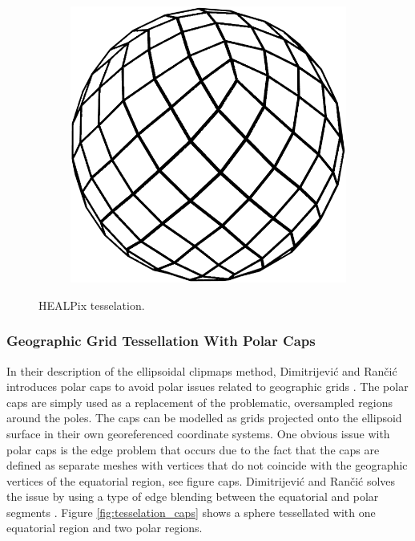 \begin{figure}
\begin{subfigure}[b]{0.2\textwidth}
    \end{subfigure}
    ~ %
    \begin{subfigure}[b]{0.2\textwidth}
        \includegraphics[width=\textwidth]{figures/tessellation/tessellation_healpix3.png}
    \end{subfigure}
    \caption{HEALPix tesselation.}
    \label{fig:tesselation_healpix}
\end{figure}

\subsubsection{Geographic Grid Tessellation With Polar Caps}

In their description of the ellipsoidal clipmaps method, Dimitrijevi\'{c} and Ran\v{c}i\'{c} introduces polar caps to avoid polar issues related to geographic grids \cite{dimi15}. The polar caps are simply used as a replacement of the problematic, oversampled regions around the poles. The caps can be modelled as grids projected onto the ellipsoid surface in their own georeferenced coordinate systems. One obvious issue with polar caps is the edge problem that occurs due to the fact that the caps are defined as separate meshes with vertices that do not coincide with the geographic vertices of the equatorial region, see figure caps. Dimitrijevi\'{c} and Ran\v{c}i\'{c} solves the issue by using a type of edge blending between the equatorial and polar segments \cite{dimi15}. Figure \ref{fig:tesselation_caps} shows a sphere tessellated with one equatorial region and two polar regions.

